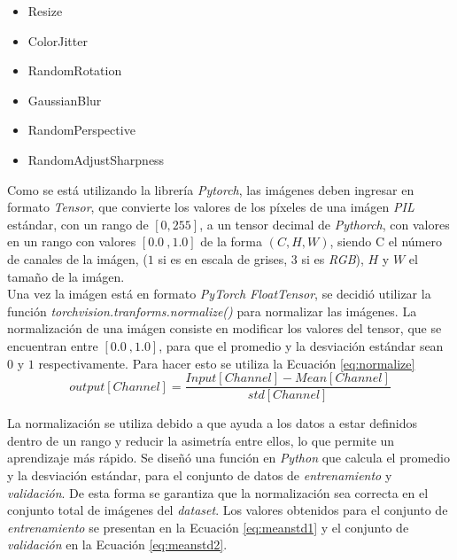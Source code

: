 \begin{itemize}
	\item Resize
	\item ColorJitter
	\item RandomRotation
	\item GaussianBlur
	\item RandomPerspective
	\item RandomAdjustSharpness
\end{itemize}

Como se está utilizando la librería \textit{Pytorch}, las imágenes deben ingresar en formato \textit{Tensor}, que convierte los valores de los píxeles de una imágen \textit{PIL} estándar, con un rango de $[0, 255]$,  a un tensor decimal de \textit{Pythorch}, con valores en un rango con valores $[0.0 \ , 1.0]$ de la forma  $(C, H, W)$, siendo C el número de canales de la imágen, ($1$ si es en escala de grises, $3$ si es \textit{RGB}), $H$ y $W$ el tamaño de la imágen. \\

Una vez la imágen está en formato \textit{PyTorch FloatTensor}, se decidió utilizar la función \textit{torchvision.tranforms.normalize()} para normalizar las imágenes. La normalización de una imágen consiste en modificar los valores del tensor, que se encuentran entre $[0.0 \ , 1.0]$, para que el promedio y la desviación estándar sean $0$ y $1$ respectivamente. Para hacer esto se utiliza la Ecuación \ref{eq:normalize} \cite{Pytorch}\\

\begin{equation}
	{output[Channel]=\frac{Input[Channel]-Mean[Channel]}{std[Channel]}}
	\label{eq:normalize}
\end{equation}

\vspace{0.5cm}
La normalización se utiliza debido a que ayuda a los datos a estar definidos dentro de un rango y reducir la asimetría entre ellos, lo que permite un aprendizaje más rápido. Se diseñó una función en \textit{Python} que calcula el promedio y la desviación estándar, para el conjunto de datos de \textit{entrenamiento} y \textit{validación}. De esta forma se garantiza que la normalización sea correcta en el conjunto total de imágenes del \textit{dataset}. Los valores obtenidos para el conjunto de \textit{entrenamiento} se presentan en la Ecuación \ref{eq:meanstd1} y el conjunto de \textit{validación} en la Ecuación \ref{eq:meanstd2}.\\

